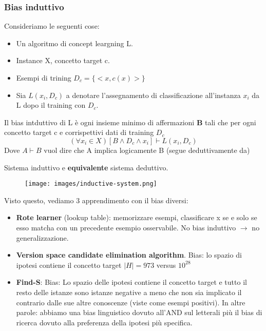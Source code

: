 \subsubsection{Bias induttivo}
Consideriamo le seguenti cose:
\begin{itemize}
    \item Un algoritmo di concept leargning L.
    \item Instance X, concetto target c.
    \item Esempi di trining $D_c = \{<x, c(x)>\}$
    \item Sia $L(x_i, D_c)$ a denotare l'assegnamento di classificazione all'instanza $x_i$ da L dopo il training con $D_c$.
\end{itemize}
\begin{definition}
    Il bias intduttivo di L è ogni insieme minimo di affermazioni \textbf{B} tali che per ogni concetto target c e corrispettivi dati di training $D_c$
    $$(\forall x_i \in X)[B \land D_c \land x_i] \vdash L(x_i, D_c)$$
    Dove $A \vdash B$ vuol dire che A implica logicamente B (segue deduttivamente da)
\end{definition}
\newpage
Sistema induttivo e \textbf{equivalente} sistema deduttivo.
\begin{figure}[h!]
    \centering
    \texttt{[image: images/inductive-system.png]}
\end{figure}
Visto questo, vediamo 3 apprendimento con il bias diversi:
\begin{itemize}
    \item \textbf{Rote learner} (lookup table): memorizzare esempi, classificare x se e solo se esso matcha con un precedente esempio osservabile. No bias induttivo $\to$ no generalizzazione.
    \item \textbf{Version space candidate elimination algorithm}. Bias: lo spazio di ipotesi contiene il concetto target $|H| = 973$ versus $10^{28}$
    \item \textbf{Find-S}: Bias: Lo spazio delle ipotesi contiene il concetto target e tutto il resto delle istanze sono istanze negative a meno che non sia implicato il contrario
    dalle sue altre conoscenze (viste come esempi positivi). In altre parole: abbiamo una bias linguistico dovuto all'AND sul
    letterali più il bias di ricerca dovuto alla preferenza della ipotesi più specifica.
\end{itemize}